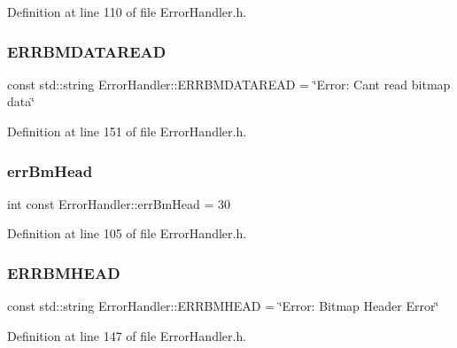 Definition at line 110 of file Error\+Handler.\+h.

\mbox{\label{classErrorHandler_a0cc80205269faf8ab6a2898627d1d078}} 
\subsubsection{\texorpdfstring{ERRBMDATAREAD}{ERRBMDATAREAD}}
{\footnotesize\ttfamily const std\+::string Error\+Handler\+::\+E\+R\+R\+B\+M\+D\+A\+T\+A\+R\+E\+AD = \char`\"{}Error\+: Can\textquotesingle{}t read bitmap data\char`\"{}\hspace{0.3cm}{\ttfamily [static]}}



Definition at line 151 of file Error\+Handler.\+h.

\mbox{\label{classErrorHandler_a9387c79594c780b28b71ec7a6adc5f8c}} 
\subsubsection{\texorpdfstring{errBmHead}{errBmHead}}
{\footnotesize\ttfamily int const Error\+Handler\+::err\+Bm\+Head = 30\hspace{0.3cm}{\ttfamily [static]}}



Definition at line 105 of file Error\+Handler.\+h.

\mbox{\label{classErrorHandler_ace09849c636b0d6692e5437dfd3fb099}} 
\subsubsection{\texorpdfstring{ERRBMHEAD}{ERRBMHEAD}}
{\footnotesize\ttfamily const std\+::string Error\+Handler\+::\+E\+R\+R\+B\+M\+H\+E\+AD = \char`\"{}Error\+: Bitmap Header Error\char`\"{}\hspace{0.3cm}{\ttfamily [static]}}



Definition at line 147 of file Error\+Handler.\+h.

